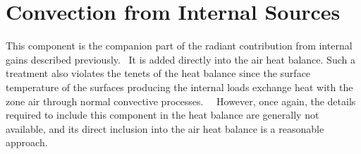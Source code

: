\section{Convection from Internal Sources}\label{convection-from-internal-sources}

This component is the companion part of the radiant contribution from internal gains described previously.~ It is added directly into the air heat balance. Such a treatment also violates the tenets of the heat balance since the surface temperature of the surfaces producing the internal loads exchange heat with the zone air through normal convective processes.~~ However, once again, the details required to include this component in the heat balance are generally not available, and its direct inclusion into the air heat balance is a reasonable approach.
